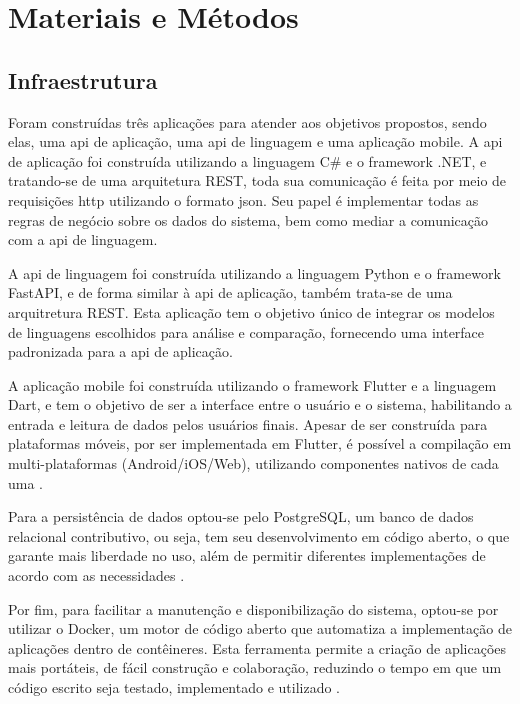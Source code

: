 \chapter{Materiais e Métodos}\label{cap:materialemetodos}

\section{Infraestrutura}\label{sec:infraestrutura}

Foram construídas três aplicações para atender aos objetivos propostos, sendo elas, uma \gls{api} de aplicação, uma \gls{api} de linguagem e uma aplicação mobile. A \gls{api} de aplicação foi construída utilizando a linguagem C{\#} e o framework .NET, e tratando-se de uma arquitetura REST, toda sua comunicação é feita por meio de requisições \gls{http} utilizando o formato \gls{json}. Seu papel é implementar todas as regras de negócio sobre os dados do sistema, bem como mediar a comunicação com a \gls{api} de linguagem.

A \gls{api} de linguagem foi construída utilizando a linguagem Python e o framework FastAPI, e de forma similar à \gls{api} de aplicação, também trata-se de uma arquitretura REST. Esta aplicação tem o objetivo único de integrar os modelos de linguagens escolhidos para análise e comparação, fornecendo uma interface padronizada para a \gls{api} de aplicação.

A aplicação mobile foi construída utilizando o framework Flutter e a linguagem Dart, e tem o objetivo de ser a interface entre o usuário e o sistema, habilitando a entrada e leitura de dados pelos usuários finais. Apesar de ser construída para plataformas móveis, por ser implementada em Flutter, é possível a compilação em multi-plataformas (Android/iOS/Web), utilizando componentes nativos de cada uma \cite{Flutter}.

Para a persistência de dados optou-se pelo PostgreSQL, um banco de dados relacional contributivo, ou seja, tem seu desenvolvimento em código aberto, o que garante mais liberdade no uso, além de permitir diferentes implementações de acordo com as necessidades \cite{PostgreSQL}.

Por fim, para facilitar a manutenção e disponibilização do sistema, optou-se por utilizar o Docker, um motor de código aberto que automatiza a implementação de aplicações dentro de contêineres. Esta ferramenta permite a criação de aplicações mais portáteis, de fácil construção e colaboração, reduzindo o tempo em que um código escrito seja testado, implementado e utilizado \cite{TheDockerBook}.

